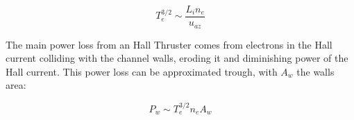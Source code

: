 \begin{equation}
\label{eq:het_ionlen}
    T_e^{3/2} \sim \frac{L_i n_e}{u_{az}}
\end{equation}

The main power loss from an Hall Thruster comes from electrons in the Hall current colliding with the channel walls, eroding it and diminishing power of the Hall current. This power loss can be approximated trough, with $A_w$ the walls area:

\begin{equation}
\label{eq:het_wallloss}
    P_w \sim T_e^{3/2} n_e A_w
\end{equation}



